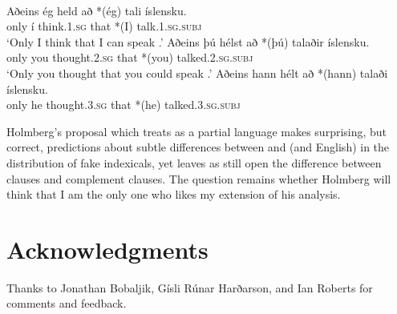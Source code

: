 \documentclass[output=paper]{LSP/langsci}
\begin{document}
\ea \label{ex:wurmbrand:9}
  \\
\ea
\gll  Aðeins  ég  held  að *(ég)  tali  íslensku.\\
only  í  think.1.\textsc{sg}  that  *(I)  talk.1.\textsc{sg.subj}   \\
\glt ‘Only I think that I can speak .’
\ex
\gll  Aðeins  þú  hélst  að  *(þú)  talaðir  íslensku.\\
only  you  thought.2.\textsc{sg}  that  *(you)  talked.2.\textsc{sg.subj}  \\
\glt ‘Only you thought that you could speak .’
\ex
\gll  Aðeins  hann  hélt  að  *(hann)  talaði  íslensku.\\
only  he  thought.3.\textsc{sg}  that  *(he)  talked.3.\textsc{sg.subj}  \\
\z
\z

Holmberg’s proposal which treats  as a partial  language makes surprising, but correct, predictions about subtle differences between  and  (and English) in the distribution of fake indexicals, yet leaves as still open the difference between  clauses and complement clauses. The question remains whether Holmberg will think that I am the only one who likes my extension of his analysis.

\section*{Acknowledgments}
Thanks to Jonathan Bobaljik, Gísli Rúnar Harðarson, and Ian Roberts for comments and feedback.
 

{\sloppy
\printbibliography[heading=subbibliography,notkeyword=this]
}
\end{document}
